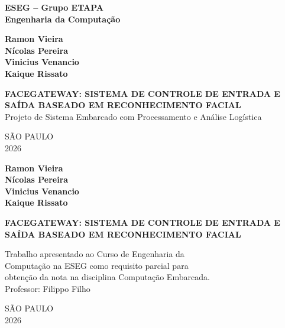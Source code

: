 \documentclass[12pt,a4paper]{report}
\begin{document}
\begin{titlepage}
    \centering

    \textbf{ESEG -- Grupo ETAPA}\\
    \textbf{Engenharia da Computação}\\
    \vspace{3cm}

    \textbf{Ramon Vieira}\\
    \textbf{Nícolas Pereira}\\
    \textbf{Vinicius Venancio}\\
    \textbf{Kaique Rissato}\\

    \vfill

    \textbf{FACEGATEWAY: SISTEMA DE CONTROLE DE ENTRADA E SAÍDA BASEADO EM RECONHECIMENTO FACIAL}\\
    \vspace{0.5cm}
    Projeto de Sistema Embarcado com Processamento e Análise Logística

    \vfill

    SÃO PAULO\\
    2026

\end{titlepage}

\begin{titlepage}
    \centering

    \textbf{Ramon Vieira}\\
    \textbf{Nícolas Pereira}\\
    \textbf{Vinicius Venancio}\\
    \textbf{Kaique Rissato}\\

    \vspace{3cm}

    \textbf{FACEGATEWAY: SISTEMA DE CONTROLE DE ENTRADA E SAÍDA BASEADO EM RECONHECIMENTO FACIAL}

    \vspace{1.5cm}

    \begin{flushright}
        Trabalho apresentado ao Curso de Engenharia da\\
        Computação na ESEG como requisito parcial para\\
        obtenção da nota na disciplina Computação Embarcada.\\
        \vspace{0.5cm}
        Professor: Filippo Filho
    \end{flushright}

    \vfill

    SÃO PAULO\\
    2026

\end{titlepage}
\end{document}
